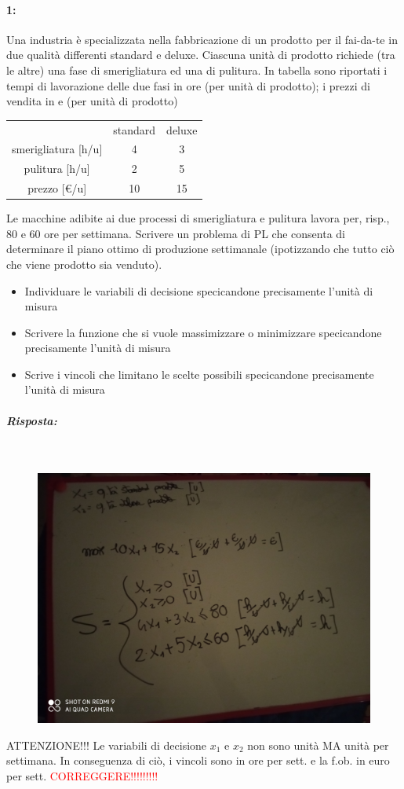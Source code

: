 \paragraph{1:} Una industria è specializzata nella fabbricazione di un prodotto per il fai-da-te in due qualità differenti standard e deluxe. Ciascuna unità di prodotto richiede (tra le altre) una fase di smerigliatura ed una di pulitura. In tabella sono riportati i tempi di lavorazione delle due fasi in ore (per unità di prodotto); i prezzi di vendita in e (per unità di prodotto)
\begin{table}[h!]
    \centering
    \begin{tabular}{|c|c|c|}
    & standard &  deluxe \\
    smerigliatura [h/u] & 4 & 3\\
    pulitura [h/u] & 2 & 5\\
    prezzo [\euro/u] & 10 & 15
    \end{tabular}
\end{table}
Le macchine adibite ai due processi di smerigliatura e pulitura lavora per, risp., 80 e 60 ore per settimana. Scrivere un problema di PL che consenta di determinare il piano ottimo di produzione settimanale (ipotizzando che tutto ciò che viene prodotto sia venduto).
\begin{itemize}
    \item Individuare le variabili di decisione specicandone precisamente l'unità di misura
    \item Scrivere la funzione che si vuole massimizzare o minimizzare specicandone precisamente l'unità di misura
    \item Scrive i vincoli che limitano le scelte possibili specicandone precisamente l'unità di misura
\end{itemize}


\subparagraph{Risposta:} 

\


\begin{figure}[h!]
    \centering
    \includegraphics[scale=0.05]{esercizio2.jpg}
\end{figure}
ATTENZIONE!!! Le variabili di decisione $x_1$ e $x_2$ non sono unità MA unità per settimana. In conseguenza di ciò, i vincoli sono in ore per sett. e la f.ob. in euro per sett. \textcolor{red}{CORREGGERE!!!!!!!!!}

